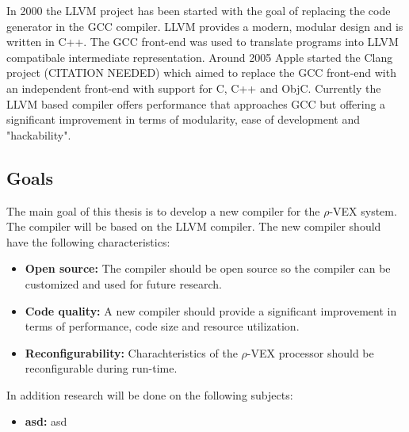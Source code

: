 In 2000 the LLVM project has been started with the goal of replacing the code generator in the GCC compiler. LLVM provides a modern, modular design and is written in C++. The GCC front-end was used to translate programs into LLVM compatibale intermediate representation. Around 2005 Apple started the Clang project (CITATION NEEDED) which aimed to replace the GCC front-end with an independent front-end with support for C, C++ and ObjC. Currently the LLVM based compiler offers performance that approaches GCC but offering a significant improvement in terms of modularity, ease of development and "hackability".

\subsection{Goals}
The main goal of this thesis is to develop a new compiler for the $\rho$-VEX system. The compiler will be based on the LLVM compiler. The new compiler should have the following characteristics:

\begin{itemize}
	\item \textbf{Open source:} The compiler should be open source so the compiler can be customized and used for future research.
	\item \textbf{Code quality:} A new compiler should provide a significant improvement in terms of performance, code size and resource utilization.
	\item \textbf{Reconfigurability:} Charachteristics of the $\rho$-VEX processor should be reconfigurable during run-time.
\end{itemize}

In addition research will be done on the following subjects:

\begin{itemize}
	\item \textbf{asd:} asd
\end{itemize}

